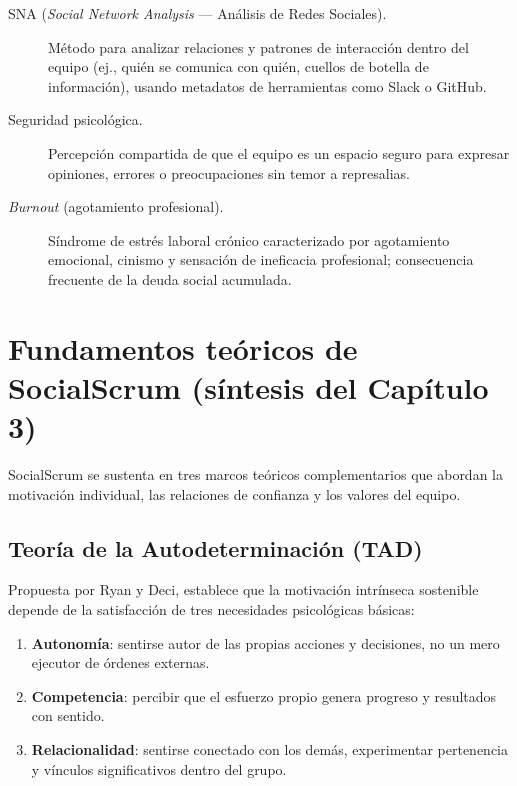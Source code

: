 \begin{description}
    \item[SNA (\textit{Social Network Analysis} --- Análisis de Redes Sociales).]
          Método para analizar relaciones y patrones de interacción dentro del equipo (ej., quién se comunica con quién, cuellos de botella de información), usando metadatos de herramientas como Slack o GitHub.

    \item[Seguridad psicológica.]
          Percepción compartida de que el equipo es un espacio seguro para expresar opiniones, errores o preocupaciones sin temor a represalias.

    \item[\textit{Burnout} (agotamiento profesional).]
          Síndrome de estrés laboral crónico caracterizado por agotamiento emocional, cinismo y sensación de ineficacia profesional; consecuencia frecuente de la deuda social acumulada.
\end{description}

\section{Fundamentos teóricos de SocialScrum (síntesis del Capítulo 3)}

SocialScrum se sustenta en tres marcos teóricos complementarios que abordan la motivación individual, las relaciones de confianza y los valores del equipo.

\subsection{Teoría de la Autodeterminación (TAD)}

Propuesta por Ryan y Deci, establece que la motivación intrínseca sostenible depende de la satisfacción de tres necesidades psicológicas básicas:

\begin{enumerate}
    \item \textbf{Autonomía}: sentirse autor de las propias acciones y decisiones, no un mero ejecutor de órdenes externas.
    \item \textbf{Competencia}: percibir que el esfuerzo propio genera progreso y resultados con sentido.
    \item \textbf{Relacionalidad}: sentirse conectado con los demás, experimentar pertenencia y vínculos significativos dentro del grupo.
\end{enumerate}


